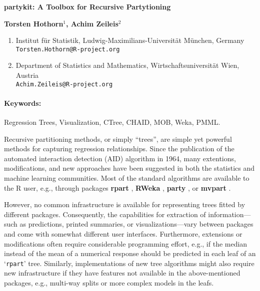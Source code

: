 \documentclass[10pt]{article}
\renewcommand{\title}[1]{\begin{center}{\bf \LARGE #1}\end{center}}
\newcommand{\keywords}{\paragraph{Keywords:}}
\let\code=\texttt
\let\pkg=\textbf
\let\proglang=\textsf
\newcommand{\class}[1]{`\code{#1}'}
\begin{document}
\pagestyle{empty}

\title{\pkg{partykit}: A Toolbox for Recursive Partytioning}

\begin{center}
  {\bf Torsten Hothorn$^{1}$, Achim Zeileis$^{2}$}
\end{center}

\begin{affiliations}
\begin{enumerate}
  \item Institut f\"ur Statistik, Ludwig-Maximilians-Universit\"at M\"unchen, Germany\\
        \texttt{Torsten.Hothorn@R-project.org}
  \item Department of Statistics and Mathematics, Wirtschaftsuniversit\"at Wien, Austria\\
        \texttt{Achim.Zeileis@R-project.org}
\end{enumerate}
\end{affiliations}

\keywords Regression Trees, Visualization, CTree, CHAID, MOB, Weka, PMML.

\vskip 0.8cm

Recursive partitioning methods, or simply ``trees'', are simple yet powerful
methods for capturing regression relationships. Since the publication of the
automated interaction detection (AID) algorithm in 1964, many extentions,
modifications, and new approaches have been suggested in both the statistics
and machine learning communities. Most of the standard algorithms are
available to the \proglang{R} user, e.g., through packages
\pkg{rpart} \citep{rpart},
\pkg{RWeka} \citep{RWeka},
\pkg{party} \citep{party}, or
\pkg{mvpart} \citep{mvpart}.

However, no common infrastructure is available for representing trees
fitted by different packages. Consequently, the capabilities for extraction of
information---such as predictions, printed summaries, or visualizations---vary
between packages and come with somewhat different user interfaces.
Furthermore, extensions or modifications often require considerable
programming effort, e.g., if the median instead of the mean of a numerical
response should be predicted in each leaf of an \class{rpart} tree.
Similarly, implementations of new tree algorithms might also require new
infrastructure if they have features not available in the above-mentioned
packages, e.g., multi-way splits or more complex models in the leafs.
\end{document}
